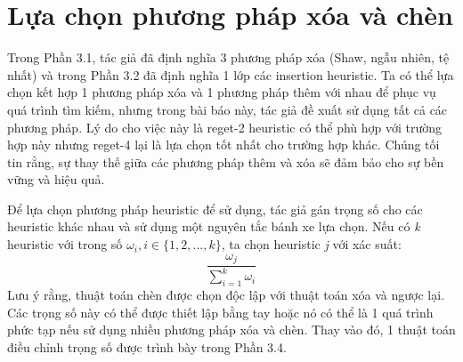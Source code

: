 \section{Lựa chọn phương pháp xóa và chèn}
Trong Phần 3.1, tác giả đã định nghĩa 3 phương pháp xóa (Shaw, ngẫu nhiên, tệ nhất) và trong Phần 3.2 đã định nghĩa 1 lớp các insertion heuristic. Ta có thể lựa chọn kết hợp 1 phương pháp xóa và 1 phương pháp thêm với nhau để phục vụ quá trình tìm kiếm, nhưng trong bài báo này, tác giả đề xuất sử dụng tất cả các phương pháp. Lý do cho việc này là reget-2 heuristic có thể phù hợp với trường hợp này nhưng reget-4 lại là lựa chọn tốt nhất cho trường hợp khác. Chúng tối tin rằng, sự thay thế giữa các phương pháp thêm và xóa sẽ đảm bảo cho sự bền vững và hiệu quả.

Để lựa chọn phương pháp heuristic để sử dụng, tác giả gán trọng số cho các heuristic khác nhau và sử dụng một nguyên tắc bánh xe lựa chọn. Nếu có \textit{k} heuristic với trong số $\omega_i, i \in \{1,2,...,k\}$, ta chọn heuristic \textit{j} với xác suất:
\begin{equation}
  \frac{\omega_j}{\sum_{i=1}^k \omega_i}
  \label{eq:20}
\end{equation}
Lưu ý rằng, thuật toán chèn được chọn độc lập với thuật toán xóa và ngược lại. Các trọng số này có thể được thiết lập bằng tay hoặc nó có thể là 1 quá trình phức tạp nếu sử dụng nhiều phương pháp xóa và chèn. Thay vào đó, 1 thuật toán điều chỉnh trọng số được trình bày trong Phần 3.4.
